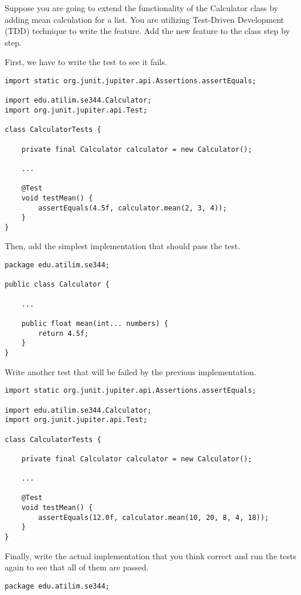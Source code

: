 \begin{exercise}
    Suppose you are going to extend the functionality of the Calculator class by adding mean calculation for a list. You are utilizing Test-Driven Development (TDD) technique to write the feature. Add the new feature to the class step by step.

    First, we have to write the test to see it fails.
    \begin{lstlisting}[caption={A unit test to testing the mean method of the Calculator class.}]
import static org.junit.jupiter.api.Assertions.assertEquals;

import edu.atilim.se344.Calculator;
import org.junit.jupiter.api.Test;

class CalculatorTests {

    private final Calculator calculator = new Calculator();

    ...
    
    @Test
    void testMean() {
        assertEquals(4.5f, calculator.mean(2, 3, 4));
    }
}
    \end{lstlisting}
    Then, add the simplest implementation that should pass the test.
    \begin{lstlisting}[caption={The simplest implementation to pass the test.}]
package edu.atilim.se344;

public class Calculator {
    
    ...
    
    public float mean(int... numbers) {
        return 4.5f;
    }
}
    \end{lstlisting}
    Write another test that will be failed by the previous implementation.
    \begin{lstlisting}[caption={Another test that invalidates the previous implementation.}]
import static org.junit.jupiter.api.Assertions.assertEquals;

import edu.atilim.se344.Calculator;
import org.junit.jupiter.api.Test;

class CalculatorTests {

    private final Calculator calculator = new Calculator();

    ...
    
    @Test
    void testMean() {
        assertEquals(12.0f, calculator.mean(10, 20, 8, 4, 18));
    }
}
    \end{lstlisting}
    Finally, write the actual implementation that you think correct and run the tests again to see that all of them are passed.
    \begin{lstlisting}[caption={A correct implementation of the mean operation.}]
package edu.atilim.se344;


\end{lstlisting}
\end{exercise}
